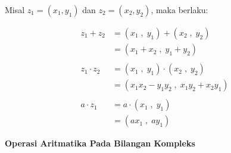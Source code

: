 \documentclass{article}
\begin{document}
Misal $ z_1 = ( x_1 , y_1 )  $ dan $ z_2 = ( x_2 , y_2 ) $, maka berlaku:

\begin{align}
    z_1 + z_2     & = ( x_1 \;,\; y_1 ) + ( x_2 \;,\; y_2 )
    \nonumber                                                       \\
                  & = ( x_1 + x_2 \;,\; y_1 + y_2 )
    \nonumber                                                       \\
    \nonumber                                                       \\
    z_1 \cdot z_2 & = ( x_1 \;,\; y_1 ) \cdot ( x_2 \;,\; y_2 )
    \nonumber                                                       \\
                  & = ( x_1 x_2 - y_1 y_2 \;,\; x_1 y_2 + x_2 y_1 )
    \nonumber                                                       \\
    \nonumber                                                       \\
    a \cdot z_1   & = a \cdot ( x_1 \;,\; y_1 )
    \nonumber                                                       \\
                  & = ( ax_1 \;,\; ay_1 )
    \nonumber
\end{align}



\newpage
\begin{center}
    \textbf{Operasi Aritmatika Pada Bilangan Kompleks}
\end{center}
\leavevmode\\
\end{document}
